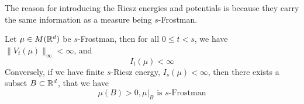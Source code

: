 The reason for introducing the Riesz energies and potentials is because they carry the same information as a measure being $s$-Frostman.
\begin{proposition}
    Let $\mu\in M(\mathbb{R}^d)$ be $s$-Frostman, then for all $0\leq t<s$, we have $\|V_t(\mu)\|_\infty<\infty$, and
    \begin{equation*}
        I_t(\mu)<\infty
    \end{equation*}
    Conversely, if we have finite $s$-Riesz energy, $I_s(\mu)<\infty$, then there exists a subset $B\subset\mathbb{R}^d$, that we have
    \begin{equation*}
        \mu(B)>0, \mu\vert_B \text{ is $s$-Frostman}
    \end{equation*}
\end{proposition}
